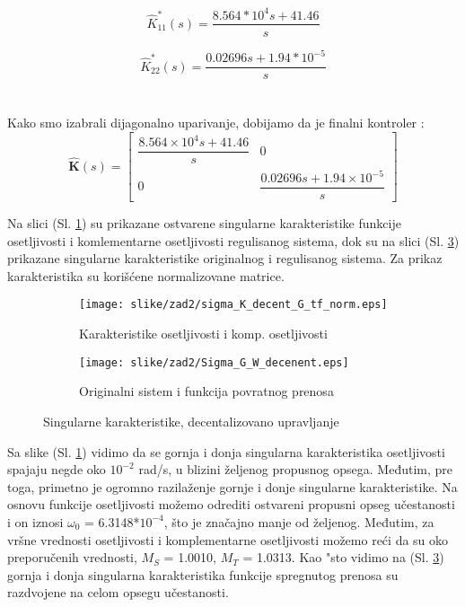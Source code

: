 \documentclass[a4paper,11pt]{article}
\theoremstyle{definition} \newtheorem{deff}{Definicija}[section]
\theoremstyle{definition} \newtheorem{prim}[deff]{Primer}
\theoremstyle{plain} \newtheorem{teor}[deff]{Teorema}
\begin{document}
	\begin{equation}
		\hat{K}^*_{11}(s) = \frac{8.564*10^4 s + 41.46}{{ s}}
	\end{equation}
	
	\begin{equation}
		\hat{K}^*_{22}(s) = \frac{0.02696 s + 1.94*10^{-5}}{{ s}}
	\end{equation}
	\\\\
	Kako smo izabrali dijagonalno uparivanje, dobijamo da je finalni kontroler : 
	\\
	
	\begin{equation}
		\hat{\textbf{K}}(s) = \begin{bmatrix} 
			\dfrac{8.564 \times 10^4 s + 41.46}{s} & 0 \\
			0 & \dfrac{0.02696 s + 1.94 \times 10^{-5}}{s}
		\end{bmatrix}
	\end{equation}
	
	\newpage
	
	Na slici (Sl. \ref{fig:sigmaDEC}) su prikazane ostvarene singularne karakteristike funkcije osetljivosti i komlementarne osetljivosti regulisanog sistema, dok su na slici (Sl. \ref{fig:sigmaG_W_dec}) prikazane singularne karakteristike originalnog i regulisanog sistema. Za prikaz karakteristika su korišćene normalizovane matrice.
	
	\hspace{2cm}
	
	\begin{figure}[h]
		\centering
		\begin{subfigure}{0.6\linewidth}
			\centering
			\texttt{[image: slike/zad2/sigma\_K\_decent\_G\_tf\_norm.eps]}
			\caption{Karakteristike osetljivosti i komp. osetljivosti}
			\label{fig:sigmaDEC}
		\end{subfigure}
		\hfill
		\begin{subfigure}{0.6\linewidth}
			\centering
			\texttt{[image: slike/zad2/Sigma\_G\_W\_decenent.eps]}
			\caption{Originalni sistem i funkcija povratnog prenosa}
			\label{fig:sigmaG_W_dec}
		\end{subfigure}
		\caption{Singularne karakteristike, decentalizovano upravljanje}
	\end{figure}
	
	\hspace{2cm}
	
	Sa slike (Sl. \ref{fig:sigmaDEC}) vidimo da se gornja i donja singularna karakteristika osetljivosti spajaju negde oko $10^{-2}$ rad/s, u blizini željenog propusnog opsega. Međutim, pre toga, primetno je ogromno razilaženje gornje i donje singularne karakteristike. Na osnovu funkcije osetljivosti možemo odrediti ostvareni propusni opseg učestanosti i on iznosi $\omega_0$ = 6.3148*$10^{-4}$, što je značajno manje od željenog. Međutim, za vršne vrednosti osetljivosti i komplementarne osetljivosti možemo reći da su oko preporučenih vrednosti, $M_S$ = 1.0010, $M_T$ = 1.0313. Kao "sto vidimo na (Sl. \ref{fig:sigmaG_W_dec}) gornja i donja singularna karakteristika funkcije spregnutog prenosa su razdvojene na celom opsegu učestanosti.
	
\end{document}
